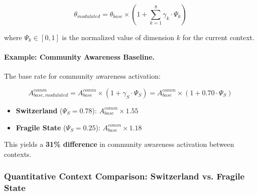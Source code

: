 \begin{equation}
\theta_{modulated} = \theta_{base} \times \left(1 + \sum_{k=1}^{8} \gamma_k \cdot \Psi_k\right)
\end{equation}

where $\Psi_k \in [0, 1]$ is the normalized value of dimension $k$ for the current context.

\paragraph{Example: Community Awareness Baseline.}
The base rate for community awareness activation:

\begin{equation}
A^{comm}_{base,modulated} = A^{comm}_{base} \times (1 + \gamma_S \cdot \Psi_S) = A^{comm}_{base} \times (1 + 0.70 \cdot \Psi_S)
\end{equation}

\begin{itemize}
    \item \textbf{Switzerland} ($\Psi_S = 0.78$): $A^{comm}_{base} \times 1.55$
    \item \textbf{Fragile State} ($\Psi_S = 0.25$): $A^{comm}_{base} \times 1.18$
\end{itemize}

This yields a \textbf{31\% difference} in community awareness activation between contexts.

\subsubsection{Quantitative Context Comparison: Switzerland vs. Fragile State}

